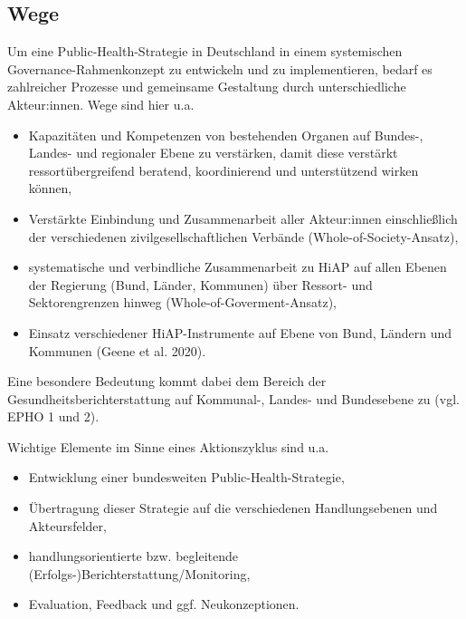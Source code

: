 \documentclass{article}
\begin{document}
\subsection{Wege}\label{H3638826}



Um eine Public-Health-Strategie in Deutschland in einem systemischen Governance-Rahmenkonzept zu entwickeln und zu implementieren, bedarf es zahlreicher Prozesse und gemeinsame Gestaltung durch unterschiedliche Akteur:innen. Wege sind hier u.a.

\begin{itemize}
\item Kapazitäten und Kompetenzen von bestehenden Organen auf Bundes-, Landes- und regionaler Ebene zu verstärken, damit diese verstärkt ressortübergreifend beratend, koordinierend und unterstützend wirken können,


\item Verstärkte Einbindung und Zusammenarbeit aller Akteur:innen einschließlich der verschiedenen zivilgesellschaftlichen Verbände (Whole-of-Society-Ansatz),


\item systematische und verbindliche Zusammenarbeit zu HiAP auf allen Ebenen der Regierung (Bund, Länder, Kommunen) über Ressort- und Sektorengrenzen hinweg (Whole-of-Goverment-Ansatz),


\item Einsatz verschiedener HiAP-Instrumente auf Ebene von Bund, Ländern und Kommunen (Geene et al. 2020).


\end{itemize}

Eine besondere Bedeutung kommt dabei dem Bereich der Gesundheitsberichterstattung auf Kommunal-, Landes- und Bundesebene zu (vgl. EPHO 1 und 2). 


Wichtige Elemente im Sinne eines Aktionszyklus sind u.a.

\begin{itemize}
\item Entwicklung einer bundesweiten Public-Health-Strategie,


\item Übertragung dieser Strategie auf die verschiedenen Handlungsebenen und Akteursfelder,


\item handlungsorientierte bzw. begleitende (Erfolgs-)Berichterstattung/Monitoring,


\item Evaluation, Feedback und ggf. Neukonzeptionen. 


\end{itemize}
\end{document}
